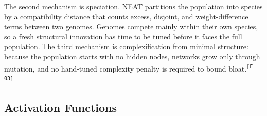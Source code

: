 \documentclass[12pt]{article}
\newcommand{\cohID}[1]{\textsuperscript{\scriptsize\texttt{[#1]}}}
\newcommand{\cohFlow}[2]{\textcolor{cohFlow}{#2}\cohID{#1}}
\begin{document}
The second mechanism is speciation.
NEAT partitions the population into species by a compatibility distance that counts excess, disjoint, and weight-difference terms between two genomes.
Genomes compete mainly within their own species, so a fresh structural innovation has time to be tuned before it faces the full population.
The third mechanism is complexification from minimal structure: because the population starts with no hidden nodes, networks grow only through mutation, and no hand-tuned complexity penalty is required to \cohFlow{F-03}{bound bloat.}



\subsection{Activation Functions}
\label{subsec:activation-functions} 
\end{document}
